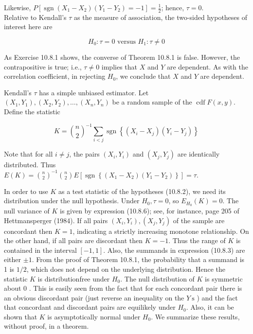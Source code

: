 Likewise, $P\left[\operatorname{sgn}\left(X_{1}-X_{2}\right)\left(Y_{1}-Y_{2}\right)=-1\right]=\frac{1}{2}$; hence, $\tau=0$.\\
Relative to Kendall's $\tau$ as the measure of association, the two-sided hypotheses of interest here are


\begin{equation*}
H_{0}: \tau=0 \text { versus } H_{1}: \tau \neq 0 \tag{10.8.2}
\end{equation*}


As Exercise 10.8.1 shows, the converse of Theorem 10.8.1 is false. However, the contrapositive is true; i.e., $\tau \neq 0$ implies that $X$ and $Y$ are dependent. As with the correlation coefficient, in rejecting $H_{0}$, we conclude that $X$ and $Y$ are dependent.

Kendall's $\tau$ has a simple unbiased estimator. Let $\left(X_{1}, Y_{1}\right),\left(X_{2}, Y_{2}\right), \ldots,\left(X_{n}, Y_{n}\right)$ be a random sample of the $\operatorname{cdf} F(x, y)$. Define the statistic


\begin{equation*}
K=\binom{n}{2}^{-1} \sum_{i<j} \operatorname{sgn}\left\{\left(X_{i}-X_{j}\right)\left(Y_{i}-Y_{j}\right)\right\} \tag{10.8.3}
\end{equation*}


Note that for all $i \neq j$, the pairs $\left(X_{i}, Y_{i}\right)$ and $\left(X_{j}, Y_{j}\right)$ are identically distributed. Thus $E(K)=\binom{n}{2}^{-1}\binom{n}{2} E\left[\operatorname{sgn}\left\{\left(X_{1}-X_{2}\right)\left(Y_{1}-Y_{2}\right)\right\}\right]=\tau$.

In order to use $K$ as a test statistic of the hypotheses (10.8.2), we need its distribution under the null hypothesis. Under $H_{0}, \tau=0$, so $E_{H_{0}}(K)=0$. The\\
null variance of $K$ is given by expression (10.8.6); see, for instance, page 205 of Hettmansperger (1984). If all pairs $\left(X_{i}, Y_{i}\right),\left(X_{j}, Y_{j}\right)$ of the sample are concordant then $K=1$, indicating a strictly increasing monotone relationship. On the other hand, if all pairs are discordant then $K=-1$. Thus the range of $K$ is contained in the interval $[-1,1]$. Also, the summands in expression (10.8.3) are either $\pm 1$. From the proof of Theorem 10.8.1, the probability that a summand is 1 is $1 / 2$, which does not depend on the underlying distribution. Hence the statistic $K$ is distributionfree under $H_{0}$. The null distribution of $K$ is symmetric about 0 . This is easily seen from the fact that for each concordant pair there is an obvious discordant pair (just reverse an inequality on the $Y \mathrm{~s}$ ) and the fact that concordant and discordant pairs are equilikely under $H_{0}$. Also, it can be shown that $K$ is asymptotically normal under $H_{0}$. We summarize these results, without proof, in a theorem.

